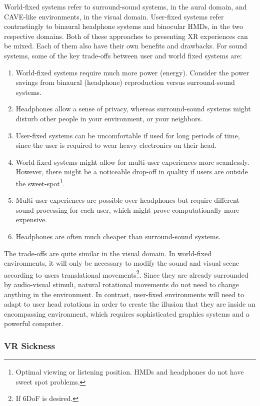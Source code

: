 World-fixed systems refer to surround-sound systems, in the aural domain, and CAVE-like environments, in the visual domain. User-fixed systems refer contrastingly to binaural headphone systems and binocular HMDs, in the two respective domains. Both of these approaches to presenting XR experiences can be mixed. Each of them also have their own benefits and drawbacks. For sound systems, some of the key trade-offs between user and world fixed systems are:

\begin{enumerate}
    \item World-fixed systems require much more power (energy). Consider the power savings from binaural (headphone) reproduction versus surround-sound systems. 
    \item Headphones allow a sense of privacy, whereas surround-sound systems might disturb other people in your environment, or your neighbors. 
    \item User-fixed systems can be uncomfortable if used for long periods of time, since the user is required to wear heavy electronics on their head. 
    \item World-fixed systems might allow for multi-user experiences more seamlessly. However, there might be a noticeable drop-off in quality if users are outside the sweet-spot\footnote{Optimal viewing or listening position. HMDs and headphones do not have sweet spot problems.}. 
    \item Multi-user experiences are possible over headphones but require different sound processing for each user, which might prove computationally more expensive.
    \item Headphones are often much cheaper than surround-sound systems. 
\end{enumerate}

The trade-offs are quite similar in the visual domain. In world-fixed environments, it will only be necessary to modify the sound and visual scene according to users translational movements\footnote{If 6DoF is desired.}. Since they are already surrounded by audio-visual stimuli, natural rotational movements do not need to change anything in the environment. In contrast, user-fixed environments will need to adapt to user head rotations in order to create the illusion that they are inside an encompassing environment, which requires sophisticated graphics systems and a powerful computer.  

\subsubsection{VR Sickness}

